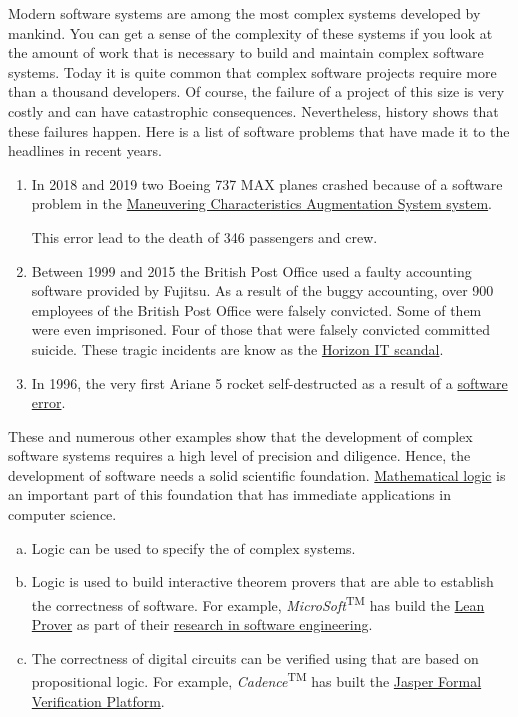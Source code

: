 Modern software systems are among the most complex systems developed by mankind.  You can get a
sense of the complexity of these systems if you look at the amount of work that is necessary to
build and maintain complex software systems.  Today it is quite common that complex software projects require
more than a thousand developers.  Of course, the failure of a project of this size is very costly and can have
catastrophic consequences.  Nevertheless, history shows that these failures happen.
Here is a list of software problems that have made it to the headlines in recent years.
\begin{enumerate}
\item In 2018 and 2019 two Boeing 737 MAX planes crashed because of a software problem in the
      \href{https://en.wikipedia.org/wiki/Maneuvering_Characteristics_Augmentation_System}{Maneuvering
        Characteristics Augmentation System system}.
      
      This error lead to the death of 346 passengers and crew.
\item Between 1999 and 2015 the British Post Office used a faulty accounting software provided by Fujitsu.
      As a result of the buggy accounting, over 900 employees of the British Post Office were falsely
      convicted.  Some of them were even imprisoned.  Four of those that were falsely convicted committed
      suicide.  These tragic incidents are know as the
      \href{https://en.wikipedia.org/wiki/British_Post_Office_scandal}{Horizon IT scandal}.     
\item In 1996, the very first Ariane 5 rocket self-destructed as a result of a
      \href{https://www.bugsnag.com/blog/bug-day-ariane-5-disaster/}{software error}. 
\end{enumerate}
These and numerous other examples show that the development of complex software systems requires a high level
of precision and diligence.  Hence, the development of software needs a solid scientific
foundation.  \href{https://en.wikipedia.org/wiki/Mathematical_logic}{Mathematical logic} 
is an important part of this foundation that has immediate applications in computer science. 
\begin{enumerate}[(a)]
\item Logic can be used to specify the  of complex systems.  
\item Logic is used to build interactive theorem provers that are able to establish the correctness of
      software.  For example, \textsl{MicroSoft}\textsuperscript{TM} has build the
      \href{https://leanprover.github.io}{Lean Prover} as part of their
      \href{https://www.microsoft.com/en-us/research/group/research-software-engineering-rise/}{research
      in software engineering}.
\item The correctness of digital circuits can be verified using  that are based on
      propositional logic.  For example, \textsl{Cadence}\textsuperscript{TM} has built the
      \href{https://www.cadence.com/en_US/home/tools/system-design-and-verification/formal-and-static-verification.html}{Jasper
        Formal Verification Platform}.
\end{enumerate}
